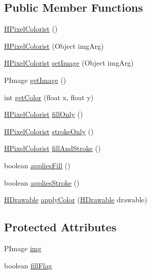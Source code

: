 \subsection*{Public Member Functions}
\begin{DoxyCompactItemize}
\item 
\hyperlink{classhype_1_1colorist_1_1_h_pixel_colorist_a5bc87ee9cb640a915a6346d265eb7ac3}{H\-Pixel\-Colorist} ()
\item 
\hyperlink{classhype_1_1colorist_1_1_h_pixel_colorist_ae5093b6c94616fb08493a0d4396e884b}{H\-Pixel\-Colorist} (Object img\-Arg)
\item 
\hyperlink{classhype_1_1colorist_1_1_h_pixel_colorist}{H\-Pixel\-Colorist} \hyperlink{classhype_1_1colorist_1_1_h_pixel_colorist_a70a068a1181343118f90eabc320f7b60}{set\-Image} (Object img\-Arg)
\item 
P\-Image \hyperlink{classhype_1_1colorist_1_1_h_pixel_colorist_a251ab048fc63631825ead9787da3e0d2}{get\-Image} ()
\item 
int \hyperlink{classhype_1_1colorist_1_1_h_pixel_colorist_ae1f9eceeb77784831b7ea6abc7d53c70}{get\-Color} (float x, float y)
\item 
\hyperlink{classhype_1_1colorist_1_1_h_pixel_colorist}{H\-Pixel\-Colorist} \hyperlink{classhype_1_1colorist_1_1_h_pixel_colorist_a888ef1f595351cd008ad119296eef64b}{fill\-Only} ()
\item 
\hyperlink{classhype_1_1colorist_1_1_h_pixel_colorist}{H\-Pixel\-Colorist} \hyperlink{classhype_1_1colorist_1_1_h_pixel_colorist_a4bbe4b11242fa7e250f296b9c8156331}{stroke\-Only} ()
\item 
\hyperlink{classhype_1_1colorist_1_1_h_pixel_colorist}{H\-Pixel\-Colorist} \hyperlink{classhype_1_1colorist_1_1_h_pixel_colorist_a31475abd22387f27e40263806ea6fdd7}{fill\-And\-Stroke} ()
\item 
boolean \hyperlink{classhype_1_1colorist_1_1_h_pixel_colorist_afe98f142c8f7cb50fcabb699439e3689}{applies\-Fill} ()
\item 
boolean \hyperlink{classhype_1_1colorist_1_1_h_pixel_colorist_abf0844521b1d35214690d8dfd821a246}{applies\-Stroke} ()
\item 
\hyperlink{classhype_1_1drawable_1_1_h_drawable}{H\-Drawable} \hyperlink{classhype_1_1colorist_1_1_h_pixel_colorist_a2184f6eb74d52cf9d56bae51785f4958}{apply\-Color} (\hyperlink{classhype_1_1drawable_1_1_h_drawable}{H\-Drawable} drawable)
\end{DoxyCompactItemize}
\subsection*{Protected Attributes}
\begin{DoxyCompactItemize}
\item 
P\-Image \hyperlink{classhype_1_1colorist_1_1_h_pixel_colorist_a700427af96c00907f5b583f019b7d6af}{img}
\item 
boolean \hyperlink{classhype_1_1colorist_1_1_h_pixel_colorist_a761a58901f795cdd1191f8a5ce21d2b9}{fill\-Flag}
\end{DoxyCompactItemize}


